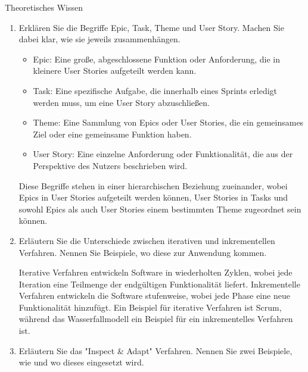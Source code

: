 \documentclass{article}
\begin{document}
\begin{exercise}{Theoretisches Wissen}
\begin{enumerate}
    \item Erklären Sie die Begriffe Epic, Task, Theme und User Story. Machen Sie dabei klar, wie sie jeweils zusammenhängen.

          \begin{solution}
            \begin{itemize}
              \item Epic: Eine große, abgeschlossene Funktion oder Anforderung, die in kleinere User Stories aufgeteilt werden kann.
              \item Task: Eine spezifische Aufgabe, die innerhalb eines Sprints erledigt werden muss, um eine User Story abzuschließen.
              \item Theme: Eine Sammlung von Epics oder User Stories, die ein gemeinsames Ziel oder eine gemeinsame Funktion haben.
              \item User Story: Eine einzelne Anforderung oder Funktionalität, die aus der Perspektive des Nutzers beschrieben wird.
            \end{itemize}
            Diese Begriffe stehen in einer hierarchischen Beziehung zueinander, wobei Epics in User Stories aufgeteilt werden können, User Stories in Tasks und sowohl Epics als auch User Stories einem bestimmten Theme zugeordnet sein können.
          \end{solution}

    \item Erläutern Sie die Unterschiede zwischen iterativen und inkrementellen Verfahren. Nennen Sie Beispiele, wo diese zur Anwendung kommen.

          \begin{solution}
            Iterative Verfahren entwickeln Software in wiederholten Zyklen, wobei jede Iteration eine Teilmenge der endgültigen Funktionalität liefert. Inkrementelle Verfahren entwickeln die Software stufenweise, wobei jede Phase eine neue Funktionalität hinzufügt. Ein Beispiel für iterative Verfahren ist Scrum, während das Wasserfallmodell ein Beispiel für ein inkrementelles Verfahren ist.
          \end{solution}

    \item Erläutern Sie das "Inspect \& Adapt" Verfahren. Nennen Sie zwei Beispiele, wie und wo dieses eingesetzt wird.


\end{enumerate}
\end{exercise}
\end{document}
